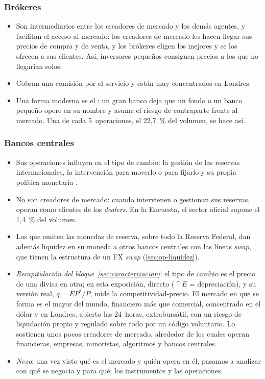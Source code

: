 \documentclass[11pt]{article}
\begin{document}
\subsubsection{Brókeres}\label{sec:brokeres}

\begin{itemize}
\item Son intermediarios entre los creadores de mercado y los demás agentes, y facilitan el acceso al mercado: los creadores de mercado les hacen llegar sus precios de compra y de venta, y los brókeres eligen los mejores y se los ofrecen a sus clientes. Así, inversores pequeños consiguen precios a los que no llegarían solos.
\item Cobran una comisión por el servicio y están muy concentrados en Londres.
\item Una forma moderna es el : un gran banco deja que un fondo o un banco pequeño opere en su nombre y asume el riesgo de contraparte frente al mercado. Una de cada 5~operaciones, el 22,7~\% del volumen, se hace así\nocite{BIS2026TrienalDatos}.
\end{itemize}

\subsubsection{Bancos centrales}\label{sec:bancos-centrales}

\begin{itemize}
\item Sus operaciones influyen en el tipo de cambio: la gestión de las reservas internacionales, la intervención para moverlo o para fijarlo y su propia política monetaria .
\item No son creadores de mercado: cuando intervienen o gestionan sus reservas, operan como clientes de los \emph{dealers}. En la Encuesta, el sector oficial supone el 1,4~\% del volumen\nocite{BIS2026TrienalDatos}.
\item Los que emiten las monedas de reserva, sobre todo la Reserva Federal, dan además liquidez en su moneda a otros bancos centrales con las líneas \emph{swap}, que tienen la estructura de un FX \emph{swap} (\ref{sec:op-liquidez}).
\end{itemize}

\begin{itemize}
\item \emph{Recapitulación del bloque~\ref{sec:caracterizacion}}: el tipo de cambio es el precio de una divisa en otra; en esta exposición, directo ($\uparrow E$ = depreciación), y su versión real, $q=EP^{*}/P$, mide la competitividad-precio. El mercado en que se forma es el mayor del mundo, financiero más que comercial, concentrado en el dólar y en Londres, abierto las 24~horas, extrabursátil, con un riesgo de liquidación propio y regulado sobre todo por un código voluntario. Lo sostienen unos pocos creadores de mercado, alrededor de los cuales operan financieras, empresas, minoristas, algoritmos y bancos centrales.
\item \emph{Nexo}: una vez visto qué es el mercado y quién opera en él, pasamos a analizar con qué se negocia y para qué: los instrumentos y las operaciones.
\end{itemize}
\end{document}

